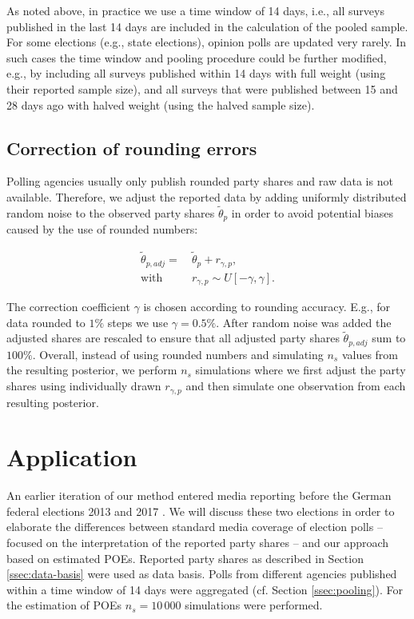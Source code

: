 \documentclass[smallcondensed]{svjour3_edited}     %
\begin{document}
As noted above, in practice we use a time window of 14 days, i.e., all surveys
published in the last 14 days are included in the calculation of the pooled
sample. For some elections (e.g., state elections), opinion polls are
updated very rarely. In such cases the time window and pooling procedure
could be further modified, e.g., by including all surveys published within 14 days with full
weight (using their reported sample size), and all surveys that were published
between 15 and 28 days ago with halved weight (using the halved sample size).


\subsection{Correction of rounding errors}\label{ssec:rounding}
Polling agencies usually only publish rounded party shares and
raw data is not available. Therefore, we adjust the reported data by adding
uniformly distributed random noise to the observed party shares $\tilde{\theta}_p$ in order
to avoid potential biases caused by the use of rounded numbers:

\begin{equation}
\begin{aligned}
\tilde{\theta}_{p,adj} = \ &\tilde{\theta}_p + r_{\gamma,p}, \\
\text{with} \ \ \ \ \ &r_{\gamma,p} \sim U[-\gamma,\gamma].
\end{aligned}
\end{equation}

The correction coefficient $\gamma$ is chosen according to rounding accuracy.
E.g., for data rounded to $1\%$ steps we use $\gamma = 0.5\%$. After random noise
was added the adjusted shares are rescaled to ensure that all adjusted party shares
$\tilde{\theta}_{p,adj}$ sum to $100\%$. Overall, instead of using rounded numbers and simulating
$n_s$ values from the resulting posterior, we perform $n_s$ simulations where we
first adjust the party shares using individually drawn $r_{\gamma,p}$ and
then simulate one observation from each resulting posterior.\\


\section{Application} \label{sec:application}
An earlier iteration of our method entered media reporting before the German
federal elections 2013 and 2017 \citep[cf.][]{wahlistik_2013, gelitz_2017}.
We will discuss these two elections in order to elaborate the differences between
standard media coverage of election polls -- focused on the interpretation of the
reported party shares -- and our approach based on estimated POEs. Reported party
shares as described in Section \ref{ssec:data-basis} were used as data basis.
Polls from different agencies published within a time window of 14 days were
aggregated (cf. Section \ref{ssec:pooling}). For the estimation of POEs
$n_{s} = 10\,000$ simulations were performed.
\end{document}
